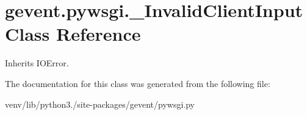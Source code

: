 \hypertarget{classgevent_1_1pywsgi_1_1___invalid_client_input}{}\section{gevent.\+pywsgi.\+\_\+\+Invalid\+Client\+Input Class Reference}
\label{classgevent_1_1pywsgi_1_1___invalid_client_input}


Inherits I\+O\+Error.



The documentation for this class was generated from the following file\+:\begin{DoxyCompactItemize}
\item 
venv/lib/python3./site-\/packages/gevent/pywsgi.\+py\end{DoxyCompactItemize}
